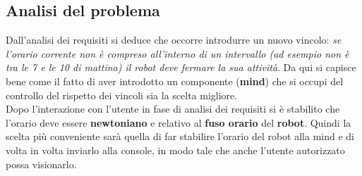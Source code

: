 \documentclass{llncs}
\begin{document}
\subsection{Analisi del problema}
\label{AnalisidelproblemaReq3}
Dall'analisi dei requisiti si deduce che occorre introdurre un nuovo vincolo: \textit{se l'orario corrente non \`e compreso all'interno di un intervallo (ad esempio non \`e tra le 7 e le 10 di mattina) il robot deve fermare la sua attivit\`a}. Da qui si capisce bene come il fatto di aver introdotto un componente (\textbf{mind}) che si occupi del controllo del rispetto dei vincoli sia la scelta migliore.\\ Dopo l'interazione con l'utente in fase di analisi dei requisiti si \`e stabilito che l'orario deve essere \textbf{newtoniano} e relativo al \textbf{fuso orario} del \textbf{robot}. Quindi la scelta pi\`u conveniente sar\`a quella di far stabilire l'orario del robot alla mind e di volta in volta inviarlo alla console, in modo tale che anche l'utente autorizzato possa visionarlo. %

\end{document}

